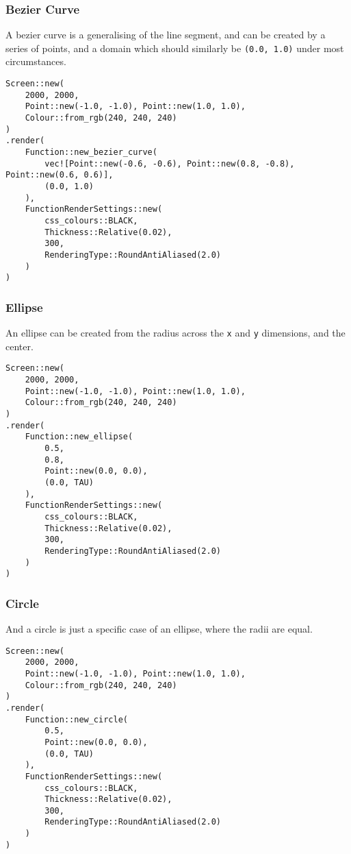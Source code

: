 
\subsubsection{Bezier Curve}

A bezier curve is a generalising of the line segment, and can be created by a series of points, and a domain which should similarly be \verb|(0.0, 1.0)| under most circumstances.

\begin{lstlisting}
Screen::new(
    2000, 2000,
    Point::new(-1.0, -1.0), Point::new(1.0, 1.0),
    Colour::from_rgb(240, 240, 240)
)
.render(
    Function::new_bezier_curve(
        vec![Point::new(-0.6, -0.6), Point::new(0.8, -0.8), Point::new(0.6, 0.6)],
        (0.0, 1.0)
    ),
    FunctionRenderSettings::new(
        css_colours::BLACK,
        Thickness::Relative(0.02),
        300,
        RenderingType::RoundAntiAliased(2.0)
    )
)
\end{lstlisting}


\subsubsection{Ellipse}

An ellipse can be created from the radius across the \verb|x| and \verb|y| dimensions, and the center.

\begin{lstlisting}
Screen::new(
    2000, 2000,
    Point::new(-1.0, -1.0), Point::new(1.0, 1.0),
    Colour::from_rgb(240, 240, 240)
)
.render(
    Function::new_ellipse(
        0.5,
        0.8,
        Point::new(0.0, 0.0),
        (0.0, TAU)
    ),
    FunctionRenderSettings::new(
        css_colours::BLACK,
        Thickness::Relative(0.02),
        300,
        RenderingType::RoundAntiAliased(2.0)
    )
)
\end{lstlisting}


\subsubsection{Circle}

And a circle is just a specific case of an ellipse, where the radii are equal.

\begin{lstlisting}
Screen::new(
    2000, 2000,
    Point::new(-1.0, -1.0), Point::new(1.0, 1.0),
    Colour::from_rgb(240, 240, 240)
)
.render(
    Function::new_circle(
        0.5,
        Point::new(0.0, 0.0),
        (0.0, TAU)
    ),
    FunctionRenderSettings::new(
        css_colours::BLACK,
        Thickness::Relative(0.02),
        300,
        RenderingType::RoundAntiAliased(2.0)
    )
)
\end{lstlisting}

